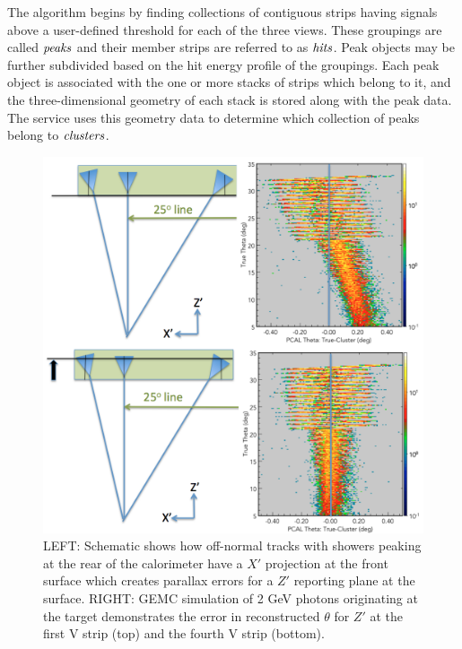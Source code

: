 The algorithm begins by finding collections of contiguous strips having signals above a user-defined threshold for each of the three views. These groupings are called $\it{peaks}$ and their member strips are referred to as $\it{hits}$.  Peak objects may be further subdivided based on the hit energy profile of the groupings.  Each peak object is associated with the one or more stacks of strips which belong to it, and the three-dimensional geometry of each stack is stored along with the peak data.  The service uses this geometry data to determine which collection of peaks belong to $\it{clusters}$. 

\begin{figure}[hbt]
\centering
\includegraphics[width=0.95\columnwidth,keepaspectratio]{img/S6_1.png}
\caption{LEFT: Schematic shows how off-normal tracks with showers peaking at the rear of the calorimeter have a $X'$ projection at the front surface which creates parallax errors for a $Z'$ reporting plane at the surface.  RIGHT: GEMC simulation of 2 GeV photons originating at the target demonstrates the error in reconstructed $\theta$ for $Z'$ at the first V strip (top) and the fourth V strip (bottom).}
\label{fig:S6_1}
\end{figure}

